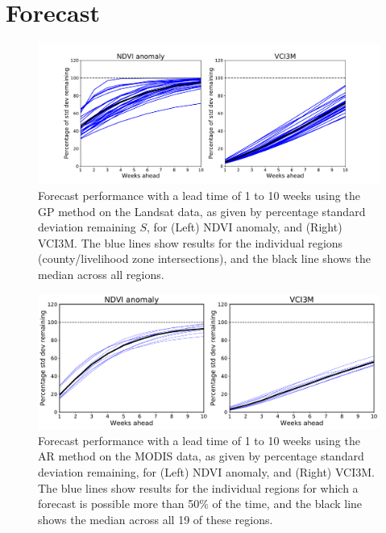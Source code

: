 \documentclass[review]{elsarticle}
\begin{document}



\newpage

\section{Forecast}

\begin{figure}
	\centering
	\includegraphics[trim = 50mm 0mm 0mm 0mm,width=14 cm]{figures/FC-pref.pdf} 
	\caption{Forecast performance with a lead time of 1 to 10 weeks using the GP method on the Landsat data, as given by percentage standard deviation remaining $S$, for (Left) NDVI anomaly, and (Right) VCI3M. The blue lines show results for the individual regions (county/livelihood zone intersections), and the black line shows the median across all regions.} \label{fig:GP_NDVI_forecast}
\end{figure}

\begin{figure}
	\centering
	\includegraphics[trim = 20mm 0mm 0mm 0mm,width=12.5cm]{figures/NDVI_forecast2.pdf} 
	\caption{Forecast performance with a lead time of 1 to 10 weeks using the AR method on the MODIS data, as given by percentage standard deviation remaining, for (Left) NDVI anomaly, and (Right) VCI3M. The blue lines show results for the individual regions for which a forecast is possible more than 50\% of the time, and the black line shows the median across all 19 of these regions.} \label{fig:NDVI_forecast}
\end{figure}
\end{document}

